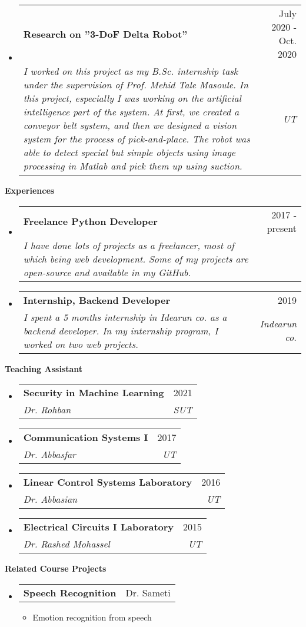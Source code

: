 \documentclass[letterpaper,12pt]{article}
\makeatletter
\def \entryspacing {-0pt}
\renewcommand{\section}[2]{\vspace{5pt}
	\colorbox{secondary}{\color{white}\raggedbottom\normalsize\textbf{{#1}{\hspace{7pt}#2}}}
}
\newcommand{\resumeEntryStart}{\begin{itemize}[leftmargin=2.5mm]}
\newcommand{\resumeEntryEnd}{\end{itemize}\vspace{\entryspacing}}
\newcommand{\resumeItemListStart}{\begin{itemize}[leftmargin=4.5mm]}
\newcommand{\resumeItemListEnd}{\end{itemize}}
\newcommand{\resumeItem}[1]{
	\item\small{
		{#1 \vspace{-2pt}}
	}
}
\newcommand{\resumeEntryTSDL}[4]{
	\vspace{-1pt}\item[]
	\begin{tabularx}{0.97\textwidth}{X@{\hspace{60pt}}r}
		\textbf{\color{primary}#1} & {\firabook\color{accent}\small#2} \\
		\textit{\color{accent}\small#3} & \textit{\color{accent}\small#4} \\
	\end{tabularx}\vspace{-6pt}
}
\newcommand{\resumeEntryTD}[2]{
	\vspace{-1pt}\item[]
	\begin{tabularx}{0.97\textwidth}{X@{\hspace{60pt}}r}
		\textbf{\color{primary}#1} & {\firabook\color{accent}\small#2} \\
	\end{tabularx}\vspace{-6pt}
}
\makeatother
\begin{document}
	\resumeEntryStart
	\resumeEntryTSDL
	{Research on ''3-DoF Delta Robot''}{July 2020 - Oct. 2020}
	{I worked on this project as my B.Sc. internship task under the supervision of Prof. Mehid Tale Masoule. In this project, especially I was working on the artificial intelligence part of the system. At first, 
		we created a conveyor belt system, and then we designed a vision system for the process of 
		pick-and-place. The robot was able to detect special but simple objects using image processing 
		in Matlab and pick them up using suction.}{UT}
	\resumeEntryEnd
	
	
	\section{\faPieChart}{Experiences}
	
	\resumeEntryStart
	\resumeEntryTSDL
	{Freelance Python Developer}{2017 - present}
	{I have done lots of projects as a freelancer, most of which being web development. Some of my projects are open-source and available in my GitHub.}{}
	\resumeEntryEnd
	
	\resumeEntryStart
	\resumeEntryTSDL
	{Internship, Backend Developer}{2019}
	{I spent a 5 months internship in Idearun co. as a backend developer. In my 
		internship program, I worked on two web projects. }{Indearun co.}
	\resumeEntryEnd
	
	
	
	\section{\faGroup}{Teaching Assistant}
	
	\resumeEntryStart
	\resumeEntryTSDL
	{Security in Machine Learning }{2021}
	{Dr. Rohban}{SUT}
	\resumeEntryEnd
	
	\resumeEntryStart
	\resumeEntryTSDL
	{Communication Systems I}{2017}
	{Dr. Abbasfar}{UT}
	\resumeEntryEnd
	
	\resumeEntryStart
	\resumeEntryTSDL
	{Linear Control Systems Laboratory}{2016}
	{Dr. Abbasian}{UT}
	\resumeEntryEnd
	
	\resumeEntryStart
	\resumeEntryTSDL
	{Electrical Circuits I Laboratory}{2015}
	{Dr. Rashed Mohassel}{UT}
	\resumeEntryEnd
	
	
	\section{\faFlask}{Related Course Projects}
	\resumeEntryStart
	\resumeEntryTD
	{Speech Recognition}{Dr. Sameti}
	\resumeItemListStart
	\resumeItem {Emotion recognition from speech}
	\resumeItemListEnd
	\resumeEntryEnd
	
\end{document}
